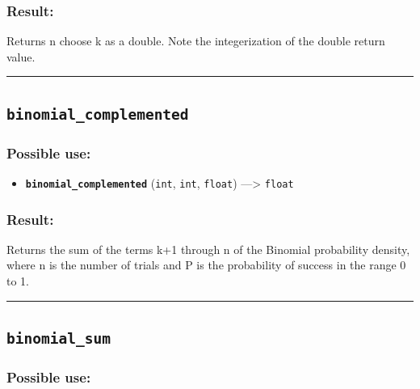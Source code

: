 \documentclass[]{book}
\providecommand{\tightlist}{%
  \setlength{\itemsep}{0pt}\setlength{\parskip}{0pt}}
\theoremstyle{definition}
\theoremstyle{definition}
\theoremstyle{definition}
\theoremstyle{remark}
\begin{document}
\subsubsection{Result:}\label{result-70}

Returns n choose k as a double. Note the integerization of the double
return value.

\begin{center}\rule{0.5\linewidth}{\linethickness}\end{center}

\subsection{\texorpdfstring{\texttt{binomial\_complemented}}{binomial\_complemented}}\label{binomial_complemented}

\subsubsection{Possible use:}\label{possible-use-72}

\begin{itemize}
\tightlist
\item
  \textbf{\texttt{binomial\_complemented}} (\texttt{int}, \texttt{int},
  \texttt{float}) ---\textgreater{} \texttt{float}
\end{itemize}

\subsubsection{Result:}\label{result-71}

Returns the sum of the terms k+1 through n of the Binomial probability
density, where n is the number of trials and P is the probability of
success in the range 0 to 1.

\begin{center}\rule{0.5\linewidth}{\linethickness}\end{center}

\subsection{\texorpdfstring{\texttt{binomial\_sum}}{binomial\_sum}}\label{binomial_sum}

\subsubsection{Possible use:}\label{possible-use-73}
\end{document}

